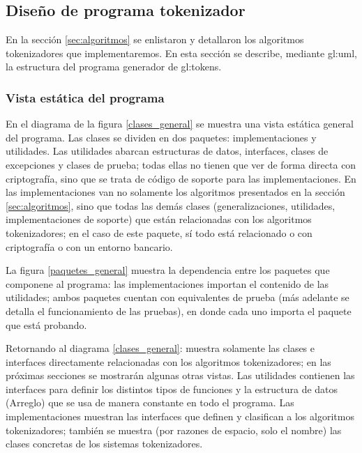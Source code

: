 %
%

\subsection{Diseño de programa tokenizador}

En la sección \ref{sec:algoritmos} se enlistaron y detallaron los algoritmos
tokenizadores que implementaremos. En esta sección se describe, mediante
\gls{gl:uml}, la estructura del programa generador de \glspl{gl:token}.

\subsubsection{Vista estática del programa}

En el diagrama de la figura \ref{clases_general} se muestra una vista estática
general del programa. Las clases se dividen en dos paquetes: implementaciones
y utilidades. Las utilidades abarcan estructuras de datos, interfaces,
clases de excepciones y clases de prueba; todas ellas no tienen que ver
de forma directa con criptografía, sino que se trata de código de soporte
para las implementaciones. En las implementaciones van no solamente
los algoritmos presentados en la sección \ref{sec:algoritmos}, sino que todas
las demás clases (generalizaciones, utilidades, implementaciones de
soporte) que están relacionadas con los algoritmos tokenizadores; en el caso
de este paquete, sí todo está relacionado o con criptografía o con un
entorno bancario.

La figura \ref{paquetes_general} muestra la dependencia entre los paquetes que
componene al programa: las implementaciones importan el contenido de las
utilidades; ambos paquetes cuentan con equivalentes de prueba (más adelante se
detalla el funcionamiento de las pruebas), en donde cada uno importa el paquete
que está probando.

Retornando al diagrama \ref{clases_general}: muestra solamente las clases
e interfaces directamente relacionadas con los algoritmos tokenizadores;
en las próximas secciones se mostrarán algunas otras vistas. Las utilidades
contienen las interfaces para definir los distintos tipos de funciones y la
estructura de datos (Arreglo) que se usa de manera constante en todo el
programa. Las implementaciones muestran las interfaces que definen y clasifican
a los algoritmos tokenizadores; también se muestra (por razones de espacio,
solo el nombre) las clases concretas de los sistemas tokenizadores.

